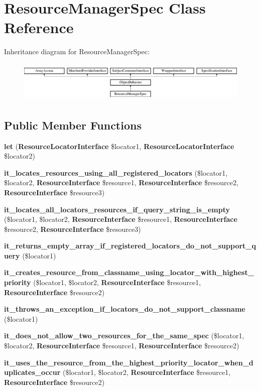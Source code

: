 \section{Resource\+Manager\+Spec Class Reference}
\label{classspec_1_1_php_spec_1_1_locator_1_1_resource_manager_spec}
Inheritance diagram for Resource\+Manager\+Spec\+:\begin{figure}[H]
\begin{center}
\leavevmode
\includegraphics[height=1.953488cm]{classspec_1_1_php_spec_1_1_locator_1_1_resource_manager_spec}
\end{center}
\end{figure}
\subsection*{Public Member Functions}
\begin{DoxyCompactItemize}
\item 
{\bf let} ({\bf Resource\+Locator\+Interface} \$locator1, {\bf Resource\+Locator\+Interface} \$locator2)
\item 
{\bf it\+\_\+locates\+\_\+resources\+\_\+using\+\_\+all\+\_\+registered\+\_\+locators} (\$locator1, \$locator2, {\bf Resource\+Interface} \$resource1, {\bf Resource\+Interface} \$resource2, {\bf Resource\+Interface} \$resource3)
\item 
{\bf it\+\_\+locates\+\_\+all\+\_\+locators\+\_\+resources\+\_\+if\+\_\+query\+\_\+string\+\_\+is\+\_\+empty} (\$locator1, \$locator2, {\bf Resource\+Interface} \$resource1, {\bf Resource\+Interface} \$resource2, {\bf Resource\+Interface} \$resource3)
\item 
{\bf it\+\_\+returns\+\_\+empty\+\_\+array\+\_\+if\+\_\+registered\+\_\+locators\+\_\+do\+\_\+not\+\_\+support\+\_\+query} (\$locator1)
\item 
{\bf it\+\_\+creates\+\_\+resource\+\_\+from\+\_\+classname\+\_\+using\+\_\+locator\+\_\+with\+\_\+highest\+\_\+priority} (\$locator1, \$locator2, {\bf Resource\+Interface} \$resource1, {\bf Resource\+Interface} \$resource2)
\item 
{\bf it\+\_\+throws\+\_\+an\+\_\+exception\+\_\+if\+\_\+locators\+\_\+do\+\_\+not\+\_\+support\+\_\+classname} (\$locator1)
\item 
{\bf it\+\_\+does\+\_\+not\+\_\+allow\+\_\+two\+\_\+resources\+\_\+for\+\_\+the\+\_\+same\+\_\+spec} (\$locator1, \$locator2, {\bf Resource\+Interface} \$resource1, {\bf Resource\+Interface} \$resource2)
\item 
{\bf it\+\_\+uses\+\_\+the\+\_\+resource\+\_\+from\+\_\+the\+\_\+highest\+\_\+priority\+\_\+locator\+\_\+when\+\_\+duplicates\+\_\+occur} (\$locator1, \$locator2, {\bf Resource\+Interface} \$resource1, {\bf Resource\+Interface} \$resource2)
\end{DoxyCompactItemize}
